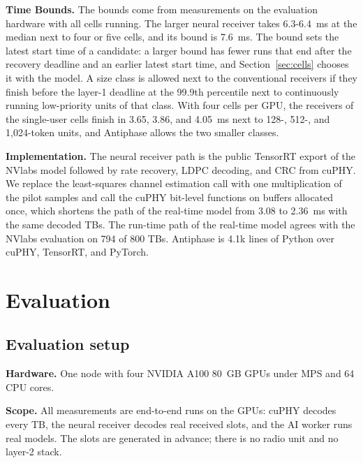 \documentclass[acmsmall,screen,review,anonymous]{acmart}
\newcommand{\sys}{Antiphase\xspace}
\begin{document}
\noindent\textbf{Time Bounds.} The bounds come from measurements on the evaluation hardware with all cells
running. The larger neural receiver takes 6.3-6.4~ms at the median next to four or five cells, and its
bound is 7.6~ms. The bound sets the latest start time of a candidate: a larger bound has fewer runs that
end after the recovery deadline and an earlier latest start time, and Section~\ref{sec:cells} chooses it
with the model. A size class is allowed next to the conventional receivers if they finish before the
layer-1 deadline at the 99.9th percentile next to continuously running low-priority units of that class.
With four cells per GPU, the receivers of the single-user cells finish in 3.65, 3.86, and 4.05~ms next to
128-, 512-, and 1,024-token units, and \sys allows the two smaller classes.

\noindent\textbf{Implementation.} The neural receiver path is the public TensorRT export of the NVlabs
model followed by rate recovery, LDPC decoding, and CRC from cuPHY. We replace the least-squares channel
estimation call with one multiplication of the pilot samples and call the cuPHY bit-level functions on
buffers allocated once, which shortens the path of the real-time model from 3.08 to 2.36~ms with the same
decoded TBs. The run-time path of the real-time model agrees with the NVlabs evaluation on 794 of 800 TBs.
\sys is 4.1k lines of Python over cuPHY, TensorRT, and PyTorch.

\section{Evaluation}
\label{sec:eval}

\subsection{Evaluation setup}

\noindent\textbf{Hardware.} One node with four NVIDIA A100 80~GB GPUs under MPS and 64 CPU cores.

\noindent\textbf{Scope.} All measurements are end-to-end runs on the GPUs: cuPHY decodes every TB, the
neural receiver decodes real received slots, and the AI worker runs real models. The slots are generated in
advance; there is no radio unit and no layer-2 stack.
\end{document}
